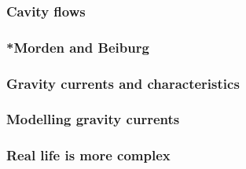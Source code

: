 \subsubsection{Cavity flows}
\subsubsection{*Morden and Beiburg}
\subsubsection{Gravity currents and characteristics}
\subsubsection{Modelling gravity currents}
\subsubsection{Real life is more complex}